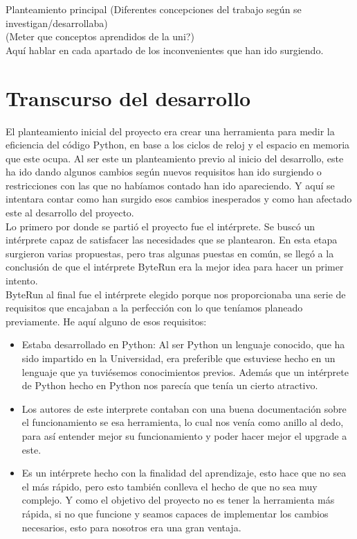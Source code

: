 

Planteamiento principal (Diferentes concepciones del trabajo según se investigan/desarrollaba)\\

(Meter que conceptos aprendidos de la uni?)\\


Aquí  hablar en cada apartado de los inconvenientes que han ido surgiendo.
\section{Transcurso del desarrollo}

El planteamiento inicial del proyecto era crear una herramienta para medir la eficiencia del código Python, en base a los ciclos de reloj y el espacio en memoria que este ocupa. Al ser este un planteamiento previo al inicio del desarrollo, este ha ido dando algunos cambios según nuevos requisitos han ido surgiendo o restricciones con las que no habíamos contado han ido apareciendo. Y aquí se intentara contar como han surgido esos cambios inesperados y como han afectado este al desarrollo del proyecto.\\
Lo primero por donde se partió el proyecto fue el intérprete. Se buscó un intérprete capaz de satisfacer las necesidades que se plantearon. En esta etapa surgieron varias propuestas, pero tras algunas puestas en común, se llegó a la conclusión de que el intérprete ByteRun era la mejor idea para hacer un primer intento.\\
ByteRun al final fue el intérprete elegido porque nos proporcionaba una serie de requisitos que encajaban a la perfección con lo que teníamos planeado previamente. He aquí alguno de esos requisitos:
\begin{itemize}
	\item Estaba desarrollado en Python: Al ser Python un lenguaje conocido, que ha sido impartido en la Universidad, era preferible que estuviese hecho en un lenguaje que ya tuviésemos conocimientos previos. Además que un intérprete de Python hecho en Python nos parecía que tenía un cierto atractivo.
	\item Los autores de este interprete contaban con una buena documentación sobre el funcionamiento se esa herramienta, lo cual nos venía como anillo al dedo, para así entender mejor su funcionamiento y poder hacer mejor el upgrade a este.
	\item Es un intérprete hecho con la finalidad del aprendizaje, esto hace que no sea el más rápido, pero esto también conlleva el hecho de que no sea muy complejo. Y como el objetivo del proyecto no es tener la herramienta más rápida, si no que funcione y seamos capaces de implementar los cambios necesarios, esto para nosotros era una gran ventaja.
\end{itemize}

